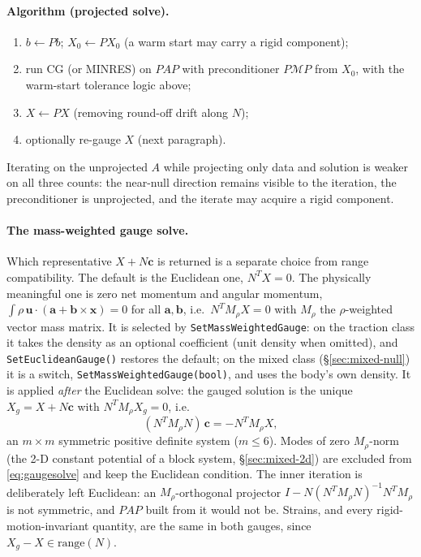 \documentclass[11pt]{article}
\numberwithin{equation}{section}
\theoremstyle{remark}
\newcommand{\vu}{\mathbf{u}}
\newcommand{\vx}{\mathbf{x}}
\newcommand{\code}[1]{\texttt{#1}}
\begin{document}
\paragraph{Algorithm (projected solve).}
\begin{enumerate}
\item $b \leftarrow Pb$; $X_0 \leftarrow PX_0$ (a warm start may carry a
  rigid component);
\item run CG (or MINRES) on $PAP$ with preconditioner $P\mathcal{M}P$ from
  $X_0$, with the warm-start tolerance logic above;
\item $X \leftarrow PX$ (removing round-off drift along $N$);
\item optionally re-gauge $X$ (next paragraph).
\end{enumerate}
Iterating on the unprojected $A$ while projecting only data and solution
is weaker on all three counts: the near-null direction remains visible to
the iteration, the preconditioner is unprojected, and the iterate may
acquire a rigid component.

\paragraph{The mass-weighted gauge solve.} Which representative
$X + N\mathbf{c}$ is returned is a separate choice from range
compatibility. The default is the Euclidean one, $N^TX = 0$. The physically
meaningful one is zero net momentum and angular momentum,
$\int\rho\,\vu\cdot(\mathbf{a} + \mathbf{b}\times\vx) = 0$ for all
$\mathbf{a},\mathbf{b}$, i.e.\ $N^T M_\rho X = 0$ with $M_\rho$ the
$\rho$-weighted vector mass matrix. It is selected by
\code{SetMassWeightedGauge}: on the traction class it takes the density as
an optional coefficient (unit density when omitted), and
\code{SetEuclideanGauge()} restores the default; on the mixed class
(\S\ref{sec:mixed-null}) it is a switch, \code{SetMassWeightedGauge(bool)},
and uses the body's own density. It is
applied \emph{after} the Euclidean solve: the gauged solution is the unique
$X_g = X + N\mathbf{c}$ with $N^TM_\rho X_g = 0$, i.e.
\begin{equation}
  (N^TM_\rho N)\,\mathbf{c} = -N^TM_\rho X ,
  \label{eq:gaugesolve}
\end{equation}
an $m\times m$ symmetric positive definite system ($m\le6$). Modes of
zero $M_\rho$-norm (the 2-D constant potential of a block system,
\S\ref{sec:mixed-2d}) are excluded from \eqref{eq:gaugesolve} and keep the
Euclidean condition. The inner iteration is deliberately left Euclidean:
an $M_\rho$-orthogonal projector $I - N(N^TM_\rho N)^{-1}N^TM_\rho$ is not
symmetric, and $PAP$ built from it would not be. Strains, and every
rigid-motion-invariant quantity, are the same in both gauges, since $X_g -
X\in\mathrm{range}(N)$.
\end{document}
